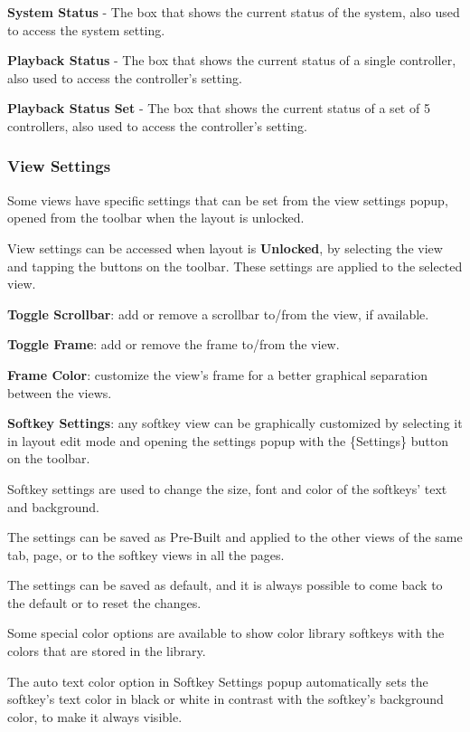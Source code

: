 \documentclass[
]{article}
\begin{document}
\textbf{System Status} - The box that shows the current status of the system, also used to access the system setting.

\textbf{Playback Status} - The box that shows the current status of a single controller, also used to access the controller's setting.

\textbf{Playback Status Set} - The box that shows the current status of a set of 5 controllers, also used to access the controller's setting.

\hypertarget{view-settings}{%
\subsubsection{View Settings}\label{view-settings}}

Some views have specific settings that can be set from the view settings popup, opened from the toolbar when the layout is unlocked.

View settings can be accessed when layout is \textbf{Unlocked}, by selecting the view and tapping the buttons on the toolbar. These settings are applied to the selected view.

\textbf{Toggle Scrollbar}: add or remove a scrollbar to/from the view, if available.

\textbf{Toggle Frame}: add or remove the frame to/from the view.

\textbf{Frame Color}: customize the view's frame for a better graphical separation between the views.

\textbf{Softkey Settings}: any softkey view can be graphically customized by selecting it in layout edit mode and opening the settings popup with the \{Settings\} button on the toolbar.

Softkey settings are used to change the size, font and color of the softkeys' text and background.

The settings can be saved as Pre-Built and applied to the other views of the same tab, page, or to the softkey views in all the pages.

The settings can be saved as default, and it is always possible to come back to the default or to reset the changes.

Some special color options are available to show color library softkeys with the colors that are stored in the library.

The auto text color option in Softkey Settings popup automatically sets the softkey's text color in black or white in contrast with the softkey's background color, to make it always visible.
\end{document}

